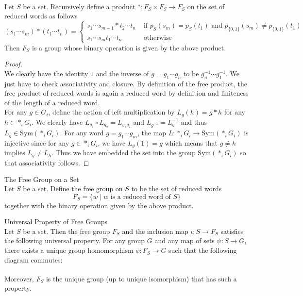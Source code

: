 \documentclass[a4paper]{article}
\begin{document}
\begin{prp}{}{}\\
Let $S$ be a set. Recursively define a product $\ast:F_S\times F_S\to F_S$ on the set of reduced words as follows $$(s_1\cdots s_m)\ast(t_1\cdots t_n)=\begin{cases}
s_1\cdots s_{m-1}\ast t_2\cdots t_n & \text{ if }p_S(s_m)=p_S(t_1)\text{ and }p_{\{0,1\}}(s_m)\neq p_{\{0,1\}}(t_1)\\
s_1\cdots s_mt_1\cdots t_n& \text{ otherwise }
\end{cases}$$
Then $F_S$ is a group whose binary operation is given by the above product. 
\begin{proof}\\
We clearly have the identity $1$ and the inverse of $g=g_1\cdots g_n$ to be $g_n^{-1}\cdots g_1^{-1}$. We just have to check associativity and closure. By definition of the free product, the free product of reduced words is again a reduced word by definition and finiteness of the length of a reduced word. \\
For any $g\in G_i$, define the action of left multiplication by $L_g(h)=g\ast h$ for any $h\in\ast_iG_i$. We clearly have $L_{g_1}\circ L_{g_2}=L_{g_1g_2}$ and $L_{g^{-1}}=L_g^{-1}$ and thus $L_g\in\text{Sym}(\ast_iG_i)$. For any word $g=g_1\cdots g_m$, the map $L:\ast_iG_i\to\text{Sym}(\ast_iG_i)$ is injective since for any $g\in\ast_iG_i$, we have $L_g(1)=g$ which means that $g\neq h$ implies $L_g\neq L_h$. Thus we have embedded the set into the group $\text{Sym}(\ast_iG_i)$ so that associativity follows. 
\end{proof}
\end{prp}

\begin{defn}{The Free Group on a Set}{}\\
Let $S$ be a set. Define the free group on $S$ to be the set of reduced words $$F_S=\{w\;|\;w\text{ is a reduced word of }S\}$$ together with the binary operation given by the above product. 
\end{defn}

\begin{prp}{Universal Property of Free Groups}{}\\
Let $S$ be a set. Then the free group $F_S$ and the inclusion map $\iota:S\to F_S$ satisfies the following universal property. For any group $G$ and any map of sets $\psi:S\to G$, there exists a unique group homomorphism $\phi:F_S\to G$ such that the following diagram commutes: \\
 \\
Moreover, $F_S$ is the unique group (up to unique isomorphism) that has such a property. 
\end{prp}
\end{document}
